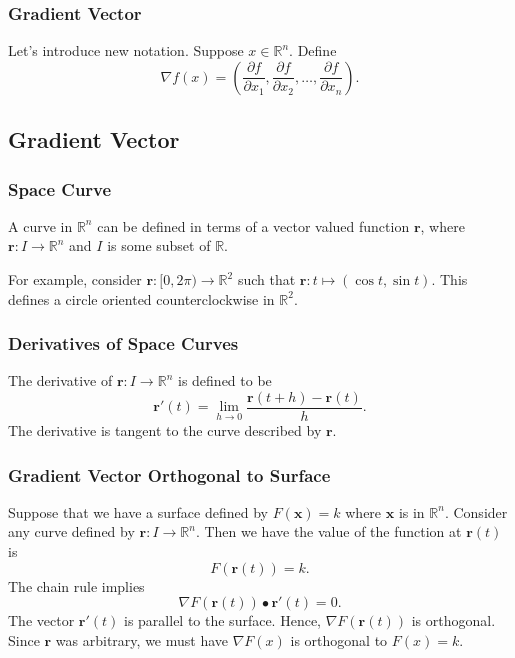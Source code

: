 \documentclass{beamer}
\begin{document}
\begin{frame}
\frametitle{Gradient Vector}
Let's introduce new notation. Suppose $x\in\mathbb{R}^n$. Define
$$
\nabla f(x) = \left(\frac{\partial f}{\partial x_1}, \frac{\partial f}{\partial x_2},\ldots, \frac{\partial f}{\partial x_n}\right).
$$
\end{frame}

\subsection{Gradient Vector}
\begin{frame}
\frametitle{Space Curve}
A curve in $\mathbb{R}^n$ can be defined in terms of a vector valued function ${\boldsymbol r}$, where ${\boldsymbol r}:I\to\mathbb{R}^n$ and $I$ is some subset of $\mathbb{R}$. 

For example, consider ${\boldsymbol r}:[0, 2\pi)\to\mathbb{R}^2$ such that ${\boldsymbol r}: t \mapsto \left(\cos t, \sin t\right)$. This defines a circle oriented counterclockwise in $\mathbb{R}^2$.
\begin{center}

\end{center}
\end{frame} 

\begin{frame}[t]
\frametitle{Derivatives of Space Curves}
The derivative of ${\boldsymbol r}:I\to\mathbb{R}^n$ is defined to be
$$
{\boldsymbol r }'(t) =\lim_{h\to 0} \frac{{\boldsymbol r}(t + h) - {\boldsymbol r}(t)}{h}.
$$
The derivative is tangent to the curve described by ${\boldsymbol r}$.
\end{frame}

\begin{frame}
\frametitle{Gradient Vector Orthogonal to Surface}
\small 
Suppose that we have a surface defined by $F({\boldsymbol x}) = k$ where ${\boldsymbol x}$ is in $\mathbb{R}^n$. Consider any curve defined by ${\boldsymbol r}: I\to \mathbb{R}^n$. Then we have the value of the function at ${\boldsymbol r}(t)$ is
$$
F({\boldsymbol r}(t)) = k.
$$
The chain rule implies
$$
\nabla F({\boldsymbol r}(t))\bullet {\boldsymbol r'}(t) = 0.
$$
The vector ${\boldsymbol r'}(t)$ is parallel to the surface. Hence, $\nabla F({\boldsymbol r}(t))$ is orthogonal. Since ${\boldsymbol r}$ was arbitrary, we must have $\nabla F(x)$ is orthogonal to $F(x) = k$.
\end{frame}
\end{document}
